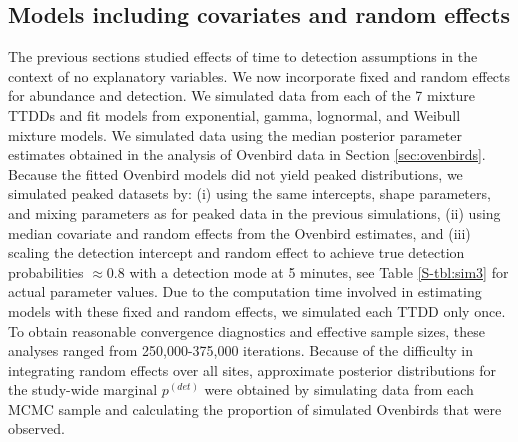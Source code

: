 \documentclass[12pt]{article}
\newcommand{\pdet}{p^{(det)}}
\begin{document}
% 





\subsection{Models including covariates and random effects}\label{sec:simfull}

The previous sections studied effects of time to detection assumptions in the context of no explanatory variables.
We now incorporate fixed and random effects for abundance and detection. 
We simulated data from each of the 7 mixture TTDDs and fit models from exponential, gamma, lognormal, and Weibull mixture models.  
We simulated data using the median posterior parameter estimates obtained in the analysis of Ovenbird data in Section \ref{sec:ovenbirds}.
Because the fitted Ovenbird models did not yield peaked distributions, we simulated peaked datasets by: (i) using the same intercepts, shape parameters, and mixing parameters as for peaked data in the previous simulations, (ii) using median covariate and random effects from the Ovenbird estimates, and (iii) scaling the detection intercept and random effect to achieve true detection probabilities $\approx 0.8$ with a detection mode at 5 minutes, see Table \ref{S-tbl:sim3} for actual parameter values.
Due to the computation time involved in estimating models with these fixed and random effects, we simulated each TTDD only once.
To obtain reasonable convergence diagnostics and effective sample sizes, these analyses ranged from 250,000-375,000 iterations.
Because of the difficulty in integrating random effects over all sites, approximate posterior distributions for the study-wide marginal $\pdet$ were obtained by simulating data from each MCMC sample and calculating the proportion of simulated Ovenbirds that were observed.
\end{document}
